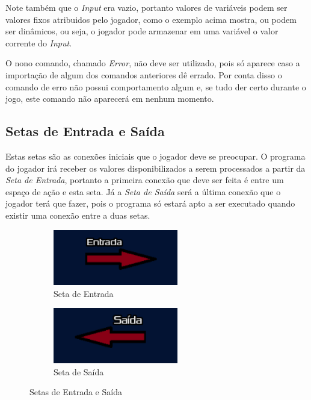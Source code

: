 Note também que o \textit{Input} era vazio, portanto valores de variáveis podem
ser valores fixos atribuidos pelo jogador, como o exemplo acima mostra, ou podem
ser dinâmicos, ou seja, o jogador pode armazenar em uma variável o valor 
corrente do \textit{Input}.

O nono comando, chamado \textit{Error}, não deve ser utilizado, pois só aparece
caso a importação de algum dos comandos anteriores dê errado. Por conta disso
o comando de erro não possui comportamento algum e, se tudo der certo durante
o jogo, este comando não aparecerá em nenhum momento.

\subsection{Setas de Entrada e Saída}

Estas setas são as conexões iniciais que o jogador deve se preocupar. O programa
do jogador irá receber os valores disponibilizados a serem processados a partir
da \textit{Seta de Entrada}, portanto a primeira conexão que deve
ser feita é entre um espaço de ação e esta seta. Já a \textit{Seta de Saída}
será a última conexão que o jogador terá que fazer, pois o programa só estará 
apto a ser executado quando existir uma conexão entre a duas setas.

\begin{figure}[H]
    \centering
    \begin{subfigure}{0.48\textwidth}
        \centering
        \includegraphics[width=0.6\textwidth]{../figuras/seta_entrada.png}
        \caption{Seta de Entrada}
    \end{subfigure}
    \begin{subfigure}{0.48\textwidth}
        \centering
        \includegraphics[width=0.6\textwidth]{../figuras/seta_saida.png}
        \caption{Seta de Saída}
    \end{subfigure}  
    \caption{Setas de Entrada e Saída}
\end{figure}

